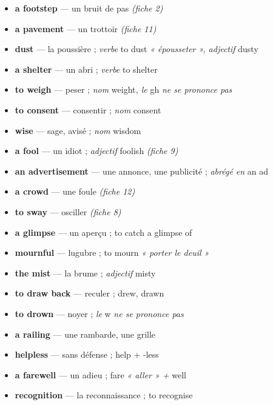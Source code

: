 \documentclass{fiche}
\begin{document}


\begin{itemize}[label=--,itemsep=0.8mm,leftmargin=*]\small
  \item \textbf{a footstep} — un bruit de pas \textit{(fiche 2)}
  \item \textbf{a pavement} — un trottoir \textit{(fiche 11)}
  \item \textbf{dust} — la poussière ; \textit{verbe} to dust \textit{« épousseter », adjectif} dusty
  \item \textbf{a shelter} — un abri ; \textit{verbe} to shelter
  \item \textbf{to weigh} — peser ; \textit{nom} weight\textit{, le} gh \textit{ne se prononce pas}
  \item \textbf{to consent} — consentir ; \textit{nom} consent
  \item \textbf{wise} — sage, avisé ; \textit{nom} wisdom
  \item \textbf{a fool} — un idiot ; \textit{adjectif} foolish \textit{(fiche 9)}
  \item \textbf{an advertisement} — une annonce, une publicité ; \textit{abrégé en} an ad
  \item \textbf{a crowd} — une foule \textit{(fiche 12)}
  \item \textbf{to sway} — osciller \textit{(fiche 8)}
  \item \textbf{a glimpse} — un aperçu ; to catch a glimpse of
  \item \textbf{mournful} — lugubre ; to mourn \textit{« porter le deuil »}
  \item \textbf{the mist} — la brume ; \textit{adjectif} misty
  \item \textbf{to draw back} — reculer ; drew, drawn
  \item \textbf{to drown} — noyer ; \textit{le} w \textit{ne se prononce pas}
  \item \textbf{a railing} — une rambarde, une grille
  \item \textbf{helpless} — sans défense ; help + -less
  \item \textbf{a farewell} — un adieu ; fare \textit{« aller » +} well
  \item \textbf{recognition} — la reconnaissance ; to recognise
\end{itemize}
\end{document}
